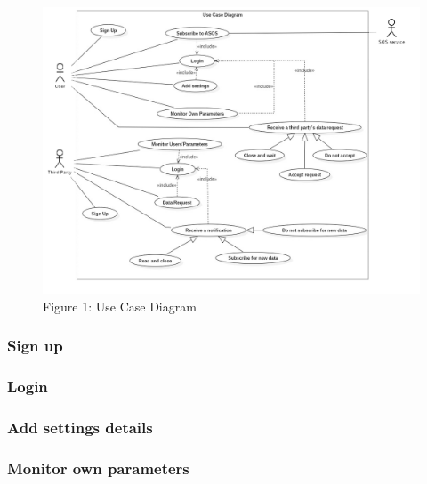 \def\A {Name}
\def\B {Actors}
\def\C {Entry conditions}
\def\D {Event Flow}
\def\E {Exit conditions}
\def\F {Exceptions}
\def\G {Goals}
\def\H {Requirements}

\renewcommand{\arraystretch}{1.5}

\begin{figure}[h!]
	\includegraphics[width=1.00\textwidth]{./pictures/usecase_diagram.png}\par
	\caption{Figure 1: Use Case Diagram}
\end{figure}

\FloatBarrier

\subsubsection{Sign up}


\subsubsection{Login}


\subsubsection{Add settings details}


\subsubsection{Monitor own parameters}


